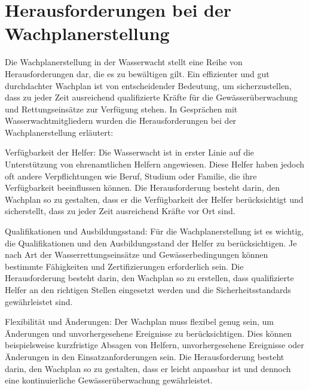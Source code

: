 \documentclass[fontsize=12pt,openright,oneside,paper=a4,BCOR=1cm]{scrbook}
\begin{document}

\section{Herausforderungen bei der Wachplanerstellung}

Die Wachplanerstellung in der Wasserwacht stellt eine Reihe von Herausforderungen dar, die es zu bewältigen gilt. Ein effizienter und gut durchdachter Wachplan ist von entscheidender Bedeutung, um sicherzustellen, dass zu jeder Zeit ausreichend qualifizierte Kräfte für die Gewässerüberwachung und Rettungseinsätze zur Verfügung stehen. In Gesprächen mit Wasserwachtmitgliedern wurden die Herausforderungen bei der Wachplanerstellung erläutert:

    Verfügbarkeit der Helfer: Die Wasserwacht ist in erster Linie auf die Unterstützung von ehrenamtlichen Helfern angewiesen. Diese Helfer haben jedoch oft andere Verpflichtungen wie Beruf, Studium oder Familie, die ihre Verfügbarkeit beeinflussen können. Die Herausforderung besteht darin, den Wachplan so zu gestalten, dass er die Verfügbarkeit der Helfer berücksichtigt und sicherstellt, dass zu jeder Zeit ausreichend Kräfte vor Ort sind.

    Qualifikationen und Ausbildungsstand: Für die Wachplanerstellung ist es wichtig, die Qualifikationen und den Ausbildungsstand der Helfer zu berücksichtigen. Je nach Art der Wasserrettungseinsätze und Gewässerbedingungen können bestimmte Fähigkeiten und Zertifizierungen erforderlich sein. Die Herausforderung besteht darin, den Wachplan so zu erstellen, dass qualifizierte Helfer an den richtigen Stellen eingesetzt werden und die Sicherheitsstandards gewährleistet sind.

    Flexibilität und Änderungen: Der Wachplan muss flexibel genug sein, um Änderungen und unvorhergesehene Ereignisse zu berücksichtigen. Dies können beispielsweise kurzfristige Absagen von Helfern, unvorhergesehene Ereignisse oder Änderungen in den Einsatzanforderungen sein. Die Herausforderung besteht darin, den Wachplan so zu gestalten, dass er leicht anpassbar ist und dennoch eine kontinuierliche Gewässerüberwachung gewährleistet.
\end{document}
